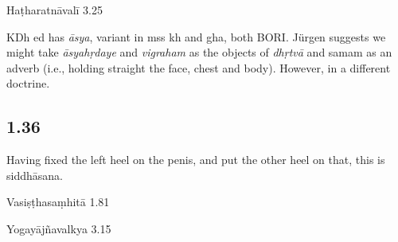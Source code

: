 \begin{ekdosis}
\begin{testimonia}[hp01_035]
Haṭharatnāvalī 3.25

\begin{versinnote}
\end{versinnote}

\end{testimonia}

\begin{philcomm}[hp01_035]
KDh ed has \emph{āsya}, variant in mss kh and gha, both BORI.
Jürgen suggests we might take \emph{āsyahṛdaye} and \emph{vigraham} as the objects of \emph{dhṛtvā} and samam as an adverb (i.e., holding straight the face, chest and body). However, in a different doctrine.
\end{philcomm}

\subsection*{1.36}
\begin{translation}[hp01_036]
Having fixed the left heel on the penis, and put the other heel on that, this is siddhāsana.
\end{translation}

\begin{sources}[hp01_036]
Vasiṣṭhasaṃhitā 1.81

\begin{versinnote}
\end{versinnote}

Yogayājñavalkya 3.15

\begin{versinnote}
\end{versinnote}

\end{sources}


\end{ekdosis}
